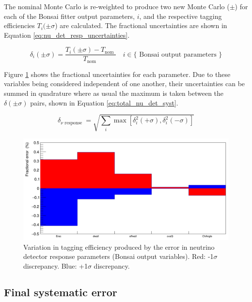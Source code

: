 The nominal Monte Carlo is re-weighted to produce two new Monte Carlo ($\pm$) for each of the Bonsai fitter output parameters, $i$, and the respective tagging efficiencies $T_{i}(\pm\sigma$) are calculated. The fractional uncertainties are shown in Equation \ref{eq:nu_det_resp_uncertainties}.


\begin{equation}
    \delta_i(\pm \sigma)=\frac{T_i(\pm \sigma)-T_{\text {nom }}}{T_{\text {nom }}} \quad i \in\{\text { Bonsai output parameters }\}
\label{eq:nu_det_resp_uncertainties}
\end{equation}

Figure \ref{fig:nu_det_syst_error} shows the fractional uncertainties for each parameter. Due to these variables being considered independent of one another, their uncertainties can be summed in quadrature where as usual the maximum is taken between the $\delta(\pm\sigma)$ pairs, shown in Equation \ref{eq:total_nu_det_syst}.

\begin{equation}
    \delta_{\text {$\nu$ response }}=\sqrt{\sum_i \max \left[\delta_i^2(+\sigma), \delta_i^2(-\sigma)\right]}
\label{eq:total_nu_det_syst}
\end{equation}

\begin{figure}[!htb]
    \centering
    \includegraphics[width=\textwidth]{Figures/nu_det_response.png}
    \caption{Variation in tagging efficiency produced by the error in neutrino detector response parameters (Bonsai output variables). Red: -1$\sigma$ discrepancy. Blue: +1$\sigma$ discrepancy. }
    \label{fig:nu_det_syst_error}
\end{figure}

\newpage


\subsection{Final systematic error}

